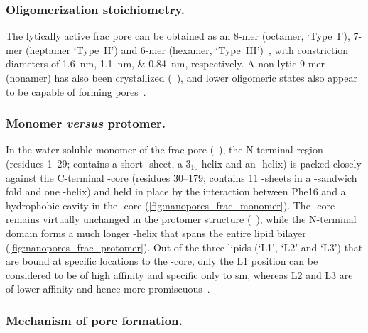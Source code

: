%
\vspace{-0.5em}
%
\subsubsection{Oligomerization stoichiometry.}
%
\vspace{-0.5em}
%

The lytically active \gls{frac} pore can be obtained as an 8-mer (octamer, `Type~I'), 7-mer (heptamer
`Type~II') and 6-mer (hexamer, `Type~III')~\cite{Huang-2019}, with constriction diameters of
\SIlist{1.6;1.1;0.84}{\nm}, respectively. A non-lytic 9-mer (nonamer) has also been crystallized
(~\cite{Mechaly-2011}), and lower oligomeric states also appear to be capable of forming
pores~\cite{Rojko-2016}.

%
\vspace{-0.5em}
%
\subsubsection{Monomer \textit{versus} protomer.}
%
\vspace{-0.5em}
%

In the water-soluble monomer of the \gls{frac} pore (~\cite{Tanaka-2015}), the N-terminal region
(residues 1--29; contains a short \tb-sheet, a $3_{10}$ helix and an \ta-helix) is packed closely against the
C-terminal \tb-core (residues 30--179; contains 11 \tb-sheets in a \tb-sandwich fold and one \ta-helix) and
held in place by the interaction between Phe16 and a hydrophobic cavity in the \tb-core
(\cref{fig:nanopores_frac_monomer}). The \tb-core remains virtually unchanged in the protomer structure
(~\cite{Tanaka-2015}), while the N-terminal domain forms a much longer \ta-helix that spans the
entire lipid bilayer (\cref{fig:nanopores_frac_protomer}). Out of the three lipids (`L1', `L2' and `L3') that
are bound at specific locations to the \tb-core, only the L1 position can be considered to be of high affinity
and specific only to \gls{sm}, whereas L2 and L3 are of lower affinity and hence more
promiscuous~\cite{Tanaka-2015}. 

%
\vspace{-0.5em}
%
\subsubsection{Mechanism of pore formation.}
%
\vspace{-0.5em}
%

